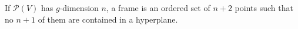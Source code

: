 If $\mathcal{P}(V)$ has $g$-dimension $n$, a frame is an ordered set of $n+2$ points such that no $n+1$ of them are contained in a hyperplane.
